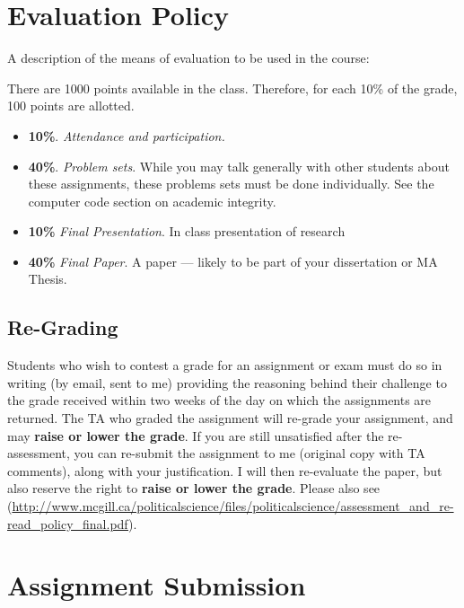 \documentclass[11pt,]{article}
\begin{document}
\section{Evaluation Policy}\label{evaluation-policy}

A description of the means of evaluation to be used in the course:

There are 1000 points available in the class. Therefore, for each 10\%
of the grade, 100 points are allotted.

\begin{itemize}
\item
  \textbf{10\%}. \emph{Attendance and participation.}
\item
  \textbf{40\%}. \emph{Problem sets}. While you may talk generally with
  other students about these assignments, these problems sets must be
  done individually. See the computer code section on academic
  integrity.
\item
  \textbf{10\%} \emph{Final Presentation}. In class presentation of
  research
\item
  \textbf{40\%} \emph{Final Paper}. A paper --- likely to be part of
  your dissertation or MA Thesis.
\end{itemize}

\subsection{Re-Grading}\label{re-grading}

Students who wish to contest a grade for an assignment or exam must do
so in writing (by email, sent to me) providing the reasoning behind
their challenge to the grade received within two weeks of the day on
which the assignments are returned. The TA who graded the assignment
will re-grade your assignment, and may \textbf{raise or lower the
grade}. If you are still unsatisfied after the re-assessment, you can
re-submit the assignment to me (original copy with TA comments), along
with your justification. I will then re-evaluate the paper, but also
reserve the right to \textbf{raise or lower the grade}. Please also see
(\url{http://www.mcgill.ca/politicalscience/files/politicalscience/assessment_and_re-read_policy_final.pdf}).

\section{Assignment Submission}\label{assignment-submission}
\end{document}
